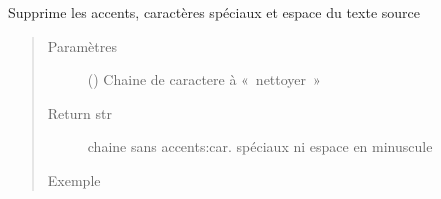 \documentclass[letterpaper,10pt,french]{sphinxmanual}
\begin{document}
\begin{fulllineitems}
\label{\detokenize{modules/tools:toolbox.tools.clean_master}}
Supprime les accents, caractères spéciaux et espace du texte source
\begin{quote}\begin{description}
\item[{Paramètres}] \leavevmode
{} () \textendash{} Chaine de caractere à « nettoyer »

\item[{Return str}] \leavevmode
chaine sans accents:car. spéciaux ni espace en minuscule

\item[{Exemple}] \leavevmode
\begin{sphinxVerbatim}[commandchars=\\\{\}]
  
 
\end{sphinxVerbatim}

\end{description}\end{quote}

\end{fulllineitems}

\end{document}
